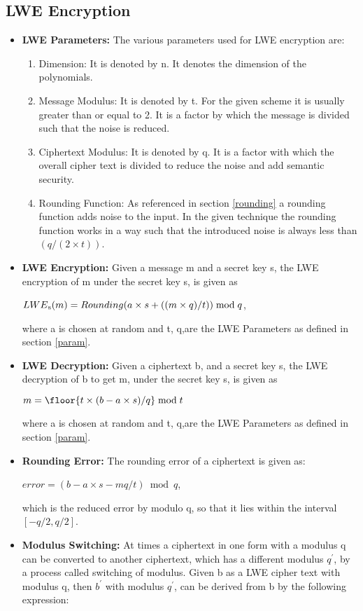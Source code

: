 \subsection{LWE Encryption}
\begin{itemize}
\item
\textbf{LWE Parameters:} \label{param}The various parameters used for LWE encryption are:
\begin{enumerate}
\item
Dimension: It is denoted by n. It denotes the dimension of the polynomials.
\item
Message Modulus: It is denoted by t. For the given scheme it is usually greater than or equal to 2. It is a factor by which the message is divided such that the noise is reduced. 
\item
Ciphertext Modulus: It is denoted by q. It is a factor with which the overall cipher text is divided to reduce the noise and add semantic security.
\item
Rounding Function: As referenced in section \ref{rounding} a rounding function adds noise to the input. In the given technique the rounding function works in a way such that the introduced noise is always less than $(q/(2\times t))$.
\end{enumerate}
\item
\textbf{LWE Encryption:} Given a message m and a secret key s, the LWE encryption of m under the secret key s, is given as

\hspace{3cm}
$LWE\textsubscript{s}(m)=Rounding(a\times s+((m\times q)/t))\bmod q$,

where a is chosen at random and t, q,are the LWE Parameters as defined in section \ref{param}.
\item
\textbf{LWE Decryption:} Given a ciphertext b, and a secret key s, the LWE decryption of b to get m, under the secret key s, is given as

\hspace{3cm}
  $m=\floor{t\times (b-a\times s)/q}\bmod t$  


where a is chosen at random and t, q,are the LWE Parameters as defined in section \ref{param}.
\item
\textbf{Rounding Error:} The rounding error of a ciphertext is given as: 

\hspace{3cm}$error=(b-a\times s-mq/t)\bmod q$,

which is the reduced error by modulo q, so that it lies within the interval $[-q/2, q/2]$.
\item
\textbf{Modulus Switching:} At times a ciphertext in one form with a modulus q can be converted to another ciphertext, which has a different modulus $q^{'}$, by a process called switching of modulus. Given b as a LWE cipher text with modulus q, then $b^{'}$ with modulus $q^{'}$, can be derived from b by the following expression:


\end{itemize}
